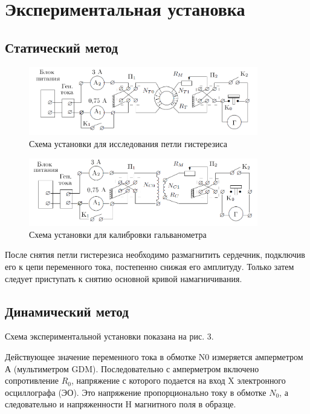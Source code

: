 \documentclass[a4paper,12pt]{article}
\begin{document}
\section{Экспериментальная установка}

\subsection{Статический метод}

\begin{figure}[h]
    \centering
    \includegraphics[width=10cm]{ust-1.png}
    \caption{Схема установки для исследования петли гистерезиса}
    \label{pic:gist}
\end{figure}

\begin{figure}[h]
    \centering
    \includegraphics[width=10cm]{ust-2.png}
    \caption{Схема установки для калибровки гальванометра}
    \label{pic:galv}
\end{figure}

После снятия петли гистерезиса необходимо размагнитить сердечник, подключив его к цепи переменного тока, постепенно снижая его амплитуду. Только затем следует приступать к снятию основной кривой намагничивания.

\subsection{Динамический метод}

Схема экспериментальной установки показана на рис. 3.

Действующее значение переменного тока в обмотке N0 измеряется амперметром А (мультиметром GDM). Последовательно с амперметром включено сопротивление $R_{0}$, напряжение с которого подается на вход X электронного осциллографа (ЭО). Это напряжение пропорционально току в обмотке $N_{0}$, а следовательно и напряженности H магнитного поля в образце.
\end{document}
